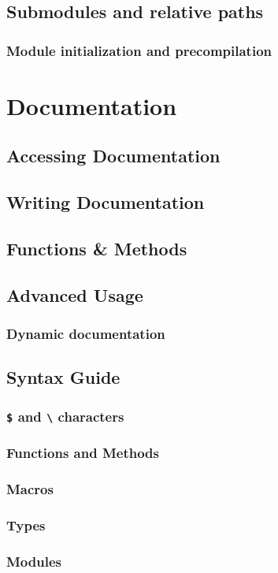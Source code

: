     \section{Submodules and relative paths}
    \subsection{Module initialization and precompilation}
  \chapter{Documentation}
    \section{Accessing Documentation}
    \section{Writing Documentation}
    \section{Functions \& Methods}
    \section{Advanced Usage}
    \subsection{Dynamic documentation}
    \section{Syntax Guide}
    \subsection{\texttt{\$} and \texttt{{\textbackslash}} characters}
    \subsection{Functions and Methods}
    \subsection{Macros}
    \subsection{Types}
    \subsection{Modules}
